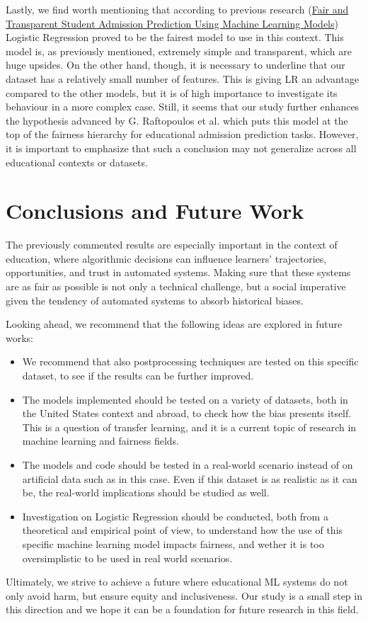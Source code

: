 \documentclass{article}
\begin{document}
Lastly, we find worth mentioning that according to previous research (\href{https://www.researchgate.net/publication/387044808_Fair_and_Transparent_Student_Admission_Prediction_Using_Machine_Learning_Models#read}{Fair and Transparent Student Admission Prediction Using Machine Learning Models}) Logistic Regression proved to be the fairest model to use in this context. This model is, as previously mentioned, extremely simple and transparent, which are huge upsides. On the other hand, though, it is necessary to underline that our dataset has a relatively small number of features. This is giving LR an advantage compared to the other models, but it is of high importance to investigate its behaviour in a more complex case. Still, it seems that our study further enhances the hypothesis advanced by G. Raftopoulos et al. which puts this model at the top of the fairness hierarchy for educational admission prediction tasks. However, it is important to emphasize that such a conclusion may not generalize across all educational contexts or datasets. 


\section{Conclusions and Future Work}

The previously commented results are especially important in the context of education, where algorithmic decisions can influence learners' trajectories, opportunities, and trust in automated systems. Making sure that these systems are as fair as possible is not only a technical challenge, but a social imperative given the tendency of automated systems to absorb historical biases. 

Looking ahead, we recommend that the following ideas are explored in future works: 
\begin{itemize}
    \item We recommend that also postprocessing techniques are tested on this specific dataset, to see if the results can be further improved.
    \item The models implemented should be tested on a variety of datasets, both in the United States context and abroad, to check how the bias presents itself. This is a question of transfer learning, and it is a current topic of research in machine learning and fairness fields.
    \item The models and code should be tested in a real-world scenario instead of on artificial data such as in this case. Even if this dataset is as realistic as it can be, the real-world implications should be studied as well.
    \item Investigation on Logistic Regression should be conducted, both from a theoretical and empirical point of view, to understand how the use of this specific machine learning model impacts fairness, and wether it is too oversimplistic to be used in real world scenarios. 
\end{itemize}

Ultimately, we strive to achieve a future where educational ML systems do not only avoid harm, but ensure equity and inclusiveness. Our study is a small step in this direction and we hope it can be a foundation for future research in this field. 



 
 
\end{document}
